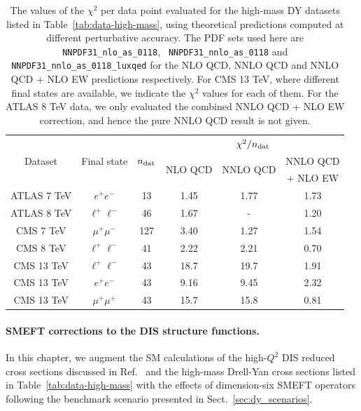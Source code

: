 \documentclass[withindex,glossary]{cam-thesis}
\begin{document}
\begin{table}[t]
  \renewcommand{\arraystretch}{1.40}
  \small
  \begin{center}
\begin{tabular}{c c c| c c c}
\toprule       
\multirow{3}{*}{Dataset} & \multirow{3}{*}{Final state} &  \multirow{3}{*}{$n_{\rm dat}$}    &  \multicolumn{3}{c}{$\chi^2/n_{\rm dat}$}   \\
      &  &      &  \multirow{2}{*}{NLO QCD}
           & \multirow{2}{*}{NNLO QCD}
& NNLO QCD \\
&  &      &  
           & 
& + NLO EW\\
\midrule
ATLAS 7 TeV  & $e^+e^-$            & 13  & 1.45  & 1.77  & 1.73 \\
ATLAS 8 TeV  & $\ell^+\ell^-$      & 46  & 1.67  & -     & 1.20 \\
\midrule
CMS 7 TeV    & $\mu^+\mu^-$        & 127 & 3.40  & 1.27  & 1.54 \\
CMS 8 TeV    & $\ell^+\ell^-$      & 41  & 2.22  & 2.21  & 0.70 \\
\midrule
CMS  13 TeV  & $\ell^+\ell^-$      & 43  & 18.7  & 19.7  & 1.91 \\
CMS  13 TeV  & $e^+e^-$            & 43  & 9.16  & 9.45  & 2.32 \\
CMS 13 TeV   & $\mu^+\mu^+$        & 43  & 15.7  & 15.8  & 0.81 \\
\bottomrule
\end{tabular}
\end{center}
  \caption{\label{tab:dysm}\small The values of the $\chi^2$ per data point
    evaluated for the  high-mass DY datasets listed in Table~\ref{tab:data-high-mass},
    using theoretical predictions computed at different perturbative accuracy.
    The PDF sets used here are {\tt NNPDF31\_nlo\_as\_0118}, {\tt
    NNPDF31\_nnlo\_as\_0118} and {\tt NNPDF31\_nnlo\_as\_0118\_luxqed} for
    the NLO QCD, NNLO QCD and NNLO QCD + NLO EW predictions respectively.
    For CMS 13 TeV, where different final states are available, we indicate the
    $\chi^2$ values for each of them.
    For the ATLAS 8 TeV data, we only evaluated the combined
    NNLO QCD + NLO EW correction, and hence the  pure NNLO QCD result is not given.
  }
\end{table}

\paragraph{SMEFT corrections to the DIS structure functions.} In this chapter, we augment the SM calculations of the high-$Q^2$ DIS
reduced cross sections discussed in Ref.~\cite{Carrazza:2019sec} and
the high-mass Drell-Yan cross sections listed in
Table~\ref{tab:data-high-mass} with the effects of dimension-six SMEFT operators following the benchmark scenario presented in
Sect.~\ref{sec:dy_scenarios}.
\end{document}
